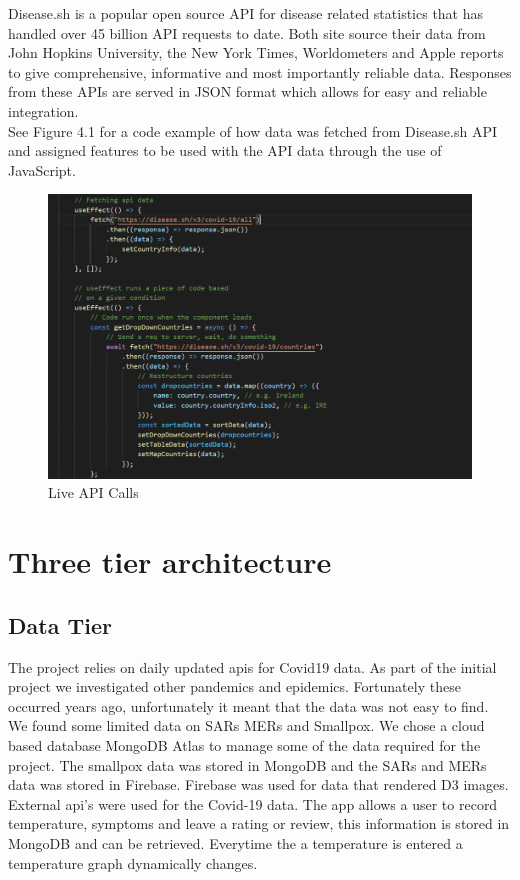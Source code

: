 Disease.sh is a popular open source API for disease related statistics that has handled over 45 billion API requests to date. Both site source their data from John Hopkins University, the New York Times, Worldometers and Apple reports to give comprehensive, informative and most importantly reliable data. Responses from these APIs are served in JSON format which allows for easy and reliable integration.\cite{disease}\\ See Figure 4.1 for a code example of how data was fetched from Disease.sh API and assigned features to be used with the API data through the use of JavaScript.

\begin{figure}[H]
    \centering
    \includegraphics[scale=0.5]{img/code.PNG}
    \caption{Live API Calls}
    \label{fig:my_label04}
\end{figure}





\section{Three tier architecture}
\subsection{Data Tier}
 The project relies on daily updated apis for Covid19 data. As part of the initial project we investigated other pandemics and epidemics. Fortunately these occurred years ago, unfortunately it meant that the data was not easy to find. We found some limited data on SARs MERs and Smallpox. We chose a cloud based database MongoDB Atlas to manage some of the data required for the project. The smallpox data was stored in MongoDB and the SARs and MERs data was stored in Firebase.
Firebase was used for data that rendered D3 images. External api's were used for the Covid-19 data. The app allows a user to record temperature, symptoms and leave a rating or review, this information is stored in MongoDB and can be retrieved. Everytime the a temperature is entered a temperature graph dynamically changes.

